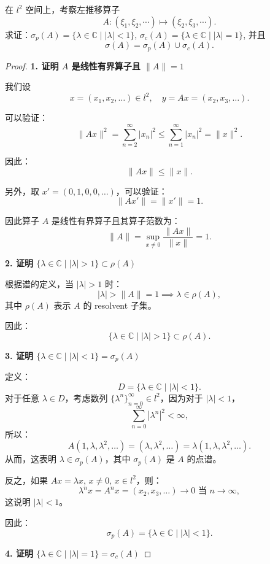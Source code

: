 \documentclass[lang=cn,newtx,10pt,scheme=chinese,thmcnt=chapter]{elegantbook}
\begin{document}
\begin{problem}
在 $l^2$ 空间上，考察左推移算子
\[
A: \left(\xi_1, \xi_2, \cdots\right) \mapsto \left(\xi_2, \xi_3, \cdots\right).
\]
求证：$\sigma_p(A) = \{\lambda \in \mathbb{C} \mid |\lambda| < 1\}$,  
$\sigma_c(A) = \{\lambda \in \mathbb{C} \mid |\lambda| = 1\}$, 并且
\[
\sigma(A) = \sigma_p(A) \cup \sigma_c(A).
\]
\end{problem}

\begin{proof}
\textbf{1. 证明 $A$ 是线性有界算子且 $\|A\| = 1$}

我们设
\[
x = (x_1, x_2, \dots) \in l^2, \quad y = A x = (x_2, x_3, \dots).
\]

可以验证：
\[
\|A x\|^2 = \sum_{n=2}^\infty |x_n|^2 \leq \sum_{n=1}^\infty |x_n|^2 = \|x\|^2.
\]

因此：
\[
\|A x\| \leq \|x\|.
\]

另外，取 $x' = (0, 1, 0, 0, \dots)$，可以验证：
\[
\|A x'\| = \|x'\| = 1.
\]

因此算子 $A$ 是线性有界算子且其算子范数为：
\[
\|A\| = \sup_{x \neq 0} \frac{\|A x\|}{\|x\|} = 1.
\]

\textbf{2. 证明  $\{\lambda \in \mathbb{C} \mid |\lambda| > 1\} \subset \rho(A)$}

根据谱的定义，当 $|\lambda| > 1$ 时：
\[
|\lambda| > \|A\| = 1 \implies \lambda \in \rho(A),
\]
其中 $\rho(A)$ 表示 $A$ 的 resolvent 子集。

因此：
\[
\{\lambda \in \mathbb{C} \mid |\lambda| > 1\} \subset \rho(A).
\]

\textbf{3. 证明  $\{\lambda \in \mathbb{C} \mid |\lambda| < 1\} = \sigma_p(A)$}

定义：
\[
D = \{\lambda \in \mathbb{C} \mid |\lambda| < 1\}.
\]
对于任意 $\lambda \in D$，考虑数列 $\{\lambda^n\}_{n=0}^\infty \in l^2$，因为对于 $|\lambda| < 1$，
\[
\sum_{n=0}^\infty |\lambda^n|^2 < \infty,
\]
所以：
\[
A (1, \lambda, \lambda^2, \dots) = (\lambda, \lambda^2, \dots) = \lambda (1, \lambda, \lambda^2, \dots).
\]
从而，这表明 $\lambda \in \sigma_p(A)$，其中 $\sigma_p(A)$ 是 $A$ 的点谱。

反之，如果 $A x = \lambda x, \, x \neq 0, \, x \in l^2$，则：
\[
\lambda^n x = A^n x = (x_2, x_3, \dots) \to 0 \text{ 当 } n \to \infty,
\]
这说明 $|\lambda| < 1$。

因此：
\[
\sigma_p(A) = \{\lambda \in \mathbb{C} \mid |\lambda| < 1\}.
\]

\textbf{4. 证明  $\{\lambda \in \mathbb{C} \mid |\lambda| = 1\} = \sigma_c(A)$}


\end{proof}
\end{document}

